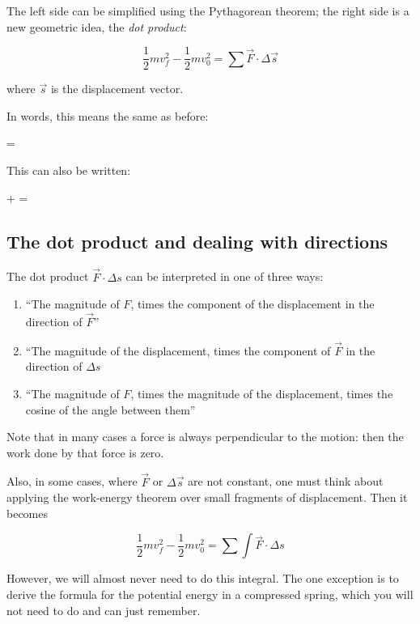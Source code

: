 \documentclass[10pt]{article}
\begin{document}
The left side can be simplified using the Pythagorean theorem; the right side is a new geometric idea, the {\it dot product}:

\begin{equation}
\frac{1}{2}mv_f^2 - \frac{1}{2}mv_0^2 = \sum \vec F \cdot \Delta \vec s
\end{equation}

where $\vec s$ is the displacement vector.

In words, this means the same as before:

 = 

This can also be written:

 +  = 

\subsection{The dot product and dealing with directions}

The dot product $\vec F \cdot \Delta s$ can be interpreted in one of three ways:

\begin{enumerate}
	\item ``The magnitude of $F$, times the component of the displacement in the direction of $\vec F$''
	\item ``The magnitude of the displacement, times the component of $\vec F$ in the direction of $\Delta s$
	\item ``The magnitude of $F$, times the magnitude of the displacement, times the cosine of the angle between them''
\end{enumerate}

Note that in many cases a force is always perpendicular to the motion: then the work done by that force is zero.

Also, in some cases, where $\vec F$ or $\Delta \vec s$ are not constant, one must think about applying the work-energy theorem over small fragments of displacement. Then it becomes

\begin{equation}
\frac{1}{2}mv_f^2 - \frac{1}{2}mv_0^2 = \sum \int \vec F \cdot \Delta s
\end{equation}

However, we will almost never need to do this integral. The one exception is to derive the formula for the potential energy in a compressed spring, which you will not need to do and can just remember.
\end{document}

